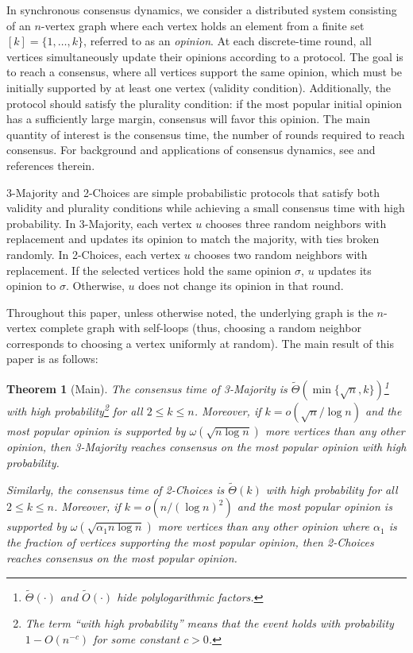 \documentclass[letterpaper,11pt]{article}
\newtheorem{theorem}{Theorem}[section]
\begin{document}
In synchronous consensus dynamics, we consider a distributed system consisting of an $n$-vertex graph where each vertex holds an element from a finite set $[k]=\{1,\dots,k\}$, referred to as an \emph{opinion}. At each discrete-time round, all vertices simultaneously update their opinions according to a protocol. The goal is to reach a consensus, where all vertices support the same opinion, which must be initially supported by at least one vertex (validity condition). Additionally, the protocol should satisfy the plurality condition: if the most popular initial opinion has a sufficiently large margin, consensus will favor this opinion. The main quantity of interest is the consensus time, the number of rounds required to reach consensus. For background and applications of consensus dynamics, see \cite{consensus_dynamics_becchetti20} and references therein.

3-Majority and 2-Choices are simple probabilistic protocols that satisfy both validity and plurality conditions while achieving a small consensus time with high probability. In 3-Majority, each vertex $u$ chooses three random neighbors with replacement and updates its opinion to match the majority, with ties broken randomly. In 2-Choices, each vertex $u$ chooses two random neighbors with replacement. If the selected vertices hold the same opinion $\sigma$, $u$ updates its opinion to $\sigma$. Otherwise, $u$ does not change its opinion in that round.

Throughout this paper, unless otherwise noted, the underlying graph is the $n$-vertex complete graph with self-loops (thus, choosing a random neighbor corresponds to choosing a vertex uniformly at random). The main result of this paper is as follows:
\begin{theorem}[Main] \label{thm:main theorem}
The consensus time of 3-Majority is $\widetilde{\Theta}(\min\{\sqrt{n},k\})$\footnote{$\widetilde{\Theta}(\cdot)$ and $\widetilde O(\cdot)$ hide polylogarithmic factors.} with high probability\footnote{The term ``with high probability'' means that the event holds with probability $1-O(n^{-c})$ for some constant $c>0$.} for all $2\le k\le n$.
Moreover, if $k = o(\sqrt{n}/\log n)$ and the most popular opinion is supported by $\omega(\sqrt{n\log n})$ more vertices than any other opinion, then 3-Majority reaches consensus on the most popular opinion with high probability.

Similarly, the consensus time of 2-Choices is $\tilde{\Theta}(k)$ with high probability for all $2\le k \le n$. Moreover, if $k=o(n/(\log n)^2)$ and 
the most popular opinion is supported by $\omega(\sqrt{\alpha_1 n\log n})$ more vertices than any other opinion where $\alpha_1$ is the fraction of vertices supporting the most popular opinion, then 2-Choices reaches consensus on the most popular opinion.
\end{theorem}
\end{document}

